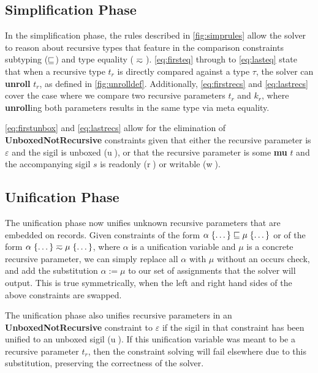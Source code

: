 \subsection{Simplification Phase}

In the simplification phase, the rules described in \autoref{fig:simprules} allow
the solver to reason about recursive types that feature in the comparison constraints
subtyping ($\sqsubseteq$) and type equality ($\typeeq$). \autoref{eq:firsteq}
through to \autoref{eq:lasteq} state that
when a recursive type $t_r$ is directly compared against a type $\tau$, the solver
can \textbf{unroll} $t_r$, as defined in \autoref{fig:unrolldef}.
Additionally, \autoref{eq:firstrecs} and \autoref{eq:lastrecs} 
cover the case where we compare two recursive parameters
$t_r$ and $k_r$, where \textbf{unroll}ing both parameters results
in the same type via meta equality.

\autoref{eq:firstunbox} and \autoref{eq:lastrecs} allow for the elimination of \textbf{UnboxedNotRecursive} constraints
given that either the recursive parameter is $\varepsilon$ and the sigil is
unboxed (\textcircled{u}), or that the recursive parameter is some \textbf{mu} $t$ and
the accompanying sigil $s$ is readonly (\textcircled{r}) or writable (\textcircled{w}).

\subsection{Unification Phase}

The unification phase now unifies unknown recursive parameters that are embedded
on records. Given constraints of the form 
$\alpha\; \{ \dots \} \sqsubseteq \mu\; \{ \dots \}$ or of the form
$\alpha\; \{ \dots \} \typeeq \mu\; \{ \dots \}$, where $\alpha$ is a unification
variable and $\mu$ is a concrete recursive parameter, we can simply replace all
$\alpha$ with $\mu$ without an occurs check, and add the substitution 
$\alpha := \mu$ to our set of assignments that the solver will output. 
This is true symmetrically, when the left and right hand sides of the above
constraints are swapped.

The unification phase also unifies recursive parameters in an \textbf{UnboxedNotRecursive}
constraint to $\varepsilon$ if the sigil in that constraint has been unified to
an unboxed sigil (\textcircled{u}). If this unification variable was meant to be a recursive
parameter $t_r$, then the constraint solving will fail elsewhere due to this substitution,
preserving the correctness of the solver.


